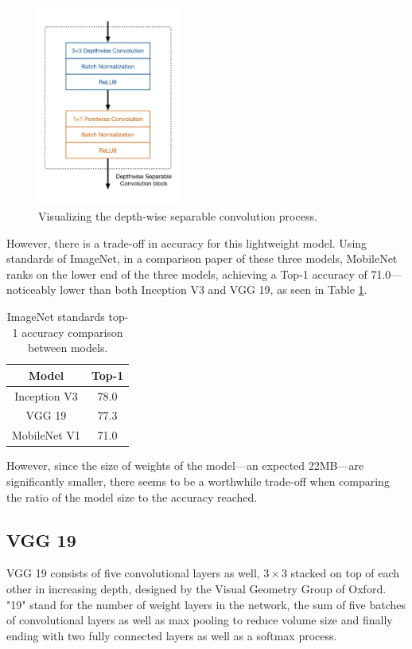 \documentclass[se,blockletter]{uw-wkrpt}
\begin{document}
\begin{figure}
  \centering
  \includegraphics[height=66mm]{depthwise-separable-conv}
  \caption{Visualizing the depth-wise separable convolution process.~\cite{ref:}}
  \label{fig:depthwise-separable-conv}
\end{figure}

However, there is a trade-off in accuracy for this lightweight model. Using standards of ImageNet, in a comparison paper of these three models, MobileNet ranks on the lower end of the three models, achieving a Top-1 accuracy of 71.0---noticeably lower than both Inception V3 and VGG 19, as seen in Table \ref{tbl:top-1-comparison}.

\begin{table}
\centering
 \begin{tabular}{|| c c ||} 
 \hline
 Model & Top-1 \\ [0.5ex] 
 \hline\hline
  Inception V3  & 78.0 \\
 \hline
  VGG 19  & 77.3  \\ 
 \hline
  MobileNet V1  & 71.0 \\ [1ex] 
 \hline
\end{tabular}
\caption{ImageNet standards top-1 accuracy comparison between models.}
\label{tbl:top-1-comparison}
\end{table}

However, since the size of weights of the model---an expected 22MB---are significantly smaller, there seems to be a worthwhile trade-off when comparing the ratio of the model size to the accuracy reached. 


\subsection{VGG 19}
VGG 19 consists of five convolutional layers as well, $3 \times 3$ stacked on top of each other in increasing depth, designed by the Visual Geometry Group of Oxford. "19" stand for the number of weight layers in the network, the sum of five batches of convolutional layers as well as max pooling to reduce volume size and finally ending with two fully connected layers as well as a softmax process.
\end{document}
